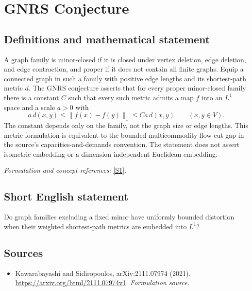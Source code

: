 \documentclass[11pt]{article}
\begin{document}
\section*{\texorpdfstring{GNRS Conjecture}{GNRS Conjecture}}\label{409}
\subsection{Definitions and mathematical statement}
A graph family is minor-closed if it is closed under vertex deletion, edge deletion, and edge contraction, and proper if it does not contain all finite graphs. Equip a connected graph in such a family with positive edge lengths and its shortest-path metric $d$. The GNRS conjecture asserts that for every proper minor-closed family there is a constant $C$ such that every such metric admits a map $f$ into an $L^1$ space and a scale $a>0$ with
\[
 a\,d(x,y)\le\|f(x)-f(y)\|_1\le C a\,d(x,y)
 \qquad(x,y\in V).
\]
The constant depends only on the family, not the graph size or edge lengths. This metric formulation is equivalent to the bounded multicommodity flow-cut gap in the source's capacities-and-demands convention. The statement does not assert isometric embedding or a dimension-independent Euclidean embedding.
\par\smallskip\textit{Formulation and concept references:} \href{https://arxiv.org/html/2111.07974v1}{[S1]}.

\subsection{Short English statement}
Do graph families excluding a fixed minor have uniformly bounded distortion when their weighted shortest-path metrics are embedded into $L^1$?
\subsection{Sources}
\begin{itemize}
\item[S1]Kawarabayashi and Sidiropoulos, arXiv:2111.07974 (2021).
\url{https://arxiv.org/html/2111.07974v1}.
\textit{Formulation source.}
\end{itemize}
\end{document}
